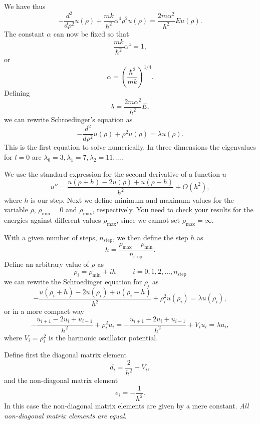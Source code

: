 \documentclass[%
twoside,                 %
final,                   %
10pt]{article}
\begin{document}
We have thus
\[
  -\frac{d^2}{d\rho^2} u(\rho) 
       + \frac{mk}{\hbar^2} \alpha^4\rho^2u(\rho)  = \frac{2m\alpha^2}{\hbar^2}E u(\rho) .
\]
The constant $\alpha$ can now be fixed
so that
\[
\frac{mk}{\hbar^2} \alpha^4 = 1,
\]
or 
\[
\alpha = \left(\frac{\hbar^2}{mk}\right)^{1/4}.
\]
Defining
\[
\lambda = \frac{2m\alpha^2}{\hbar^2}E,
\]
we can rewrite Schroedinger's equation as
\[
  -\frac{d^2}{d\rho^2} u(\rho) + \rho^2u(\rho)  = \lambda u(\rho) .
\]
This is the first equation to solve numerically. In three dimensions 
the eigenvalues for $l=0$ are 
$\lambda_0=3,\lambda_1=7,\lambda_2=11,\dots .$


We use the standard
expression for the second derivative of a function $u$
\begin{equation}
    u''=\frac{u(\rho+h) -2u(\rho) +u(\rho-h)}{h^2} +O(h^2),
    \label{eq:diffoperation}
\end{equation} 
where $h$ is our step.
Next we define minimum and maximum values for the variable $\rho$,
$\rho_{\mathrm{min}}=0$  and $\rho_{\mathrm{max}}$, respectively.
You need to check your results for the energies against different values
$\rho_{\mathrm{max}}$, since we cannot set
$\rho_{\mathrm{max}}=\infty$. 


With a given number of steps, $n_{\mathrm{step}}$, we then 
define the step $h$ as
\[
  h=\frac{\rho_{\mathrm{max}}-\rho_{\mathrm{min}} }{n_{\mathrm{step}}}.
\]
Define an arbitrary value of $\rho$ as 
\[
    \rho_i= \rho_{\mathrm{min}} + ih \hspace{1cm} i=0,1,2,\dots , n_{\mathrm{step}}
\]
we can rewrite the Schroedinger equation for $\rho_i$ as
\[
-\frac{u(\rho_i+h) -2u(\rho_i) +u(\rho_i-h)}{h^2}+\rho_i^2u(\rho_i)  = \lambda u(\rho_i),
\]
or in  a more compact way
\[
-\frac{u_{i+1} -2u_i +u_{i-1}}{h^2}+\rho_i^2u_i=-\frac{u_{i+1} -2u_i +u_{i-1} }{h^2}+V_iu_i  = \lambda u_i,
\]
where $V_i=\rho_i^2$ is the harmonic oscillator potential.


Define first the diagonal matrix element
\[
   d_i=\frac{2}{h^2}+V_i,
\]
and the non-diagonal matrix element 
\[
   e_i=-\frac{1}{h^2}.
\]
In this case the non-diagonal matrix elements are given by a mere constant. \emph{All non-diagonal matrix elements are equal}.
\end{document}
